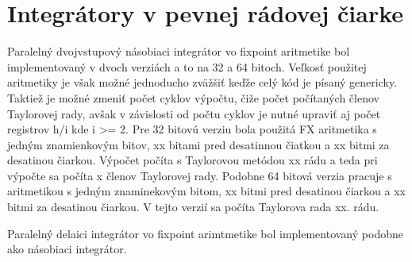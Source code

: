 \section{Integrátory v pevnej rádovej čiarke}
Paralelný dvojvstupový násobiaci integrátor vo fixpoint aritmetike bol implementovaný v dvoch verziách a to na 32 a 64 bitoch. Veľkosť použitej aritmetiky je však možné jednoducho zväžšiť keďže celý kód je písaný genericky. Taktiež je možné zmeniť počet cyklov výpočtu, čiže počet počítaných členov Taylorovej rady, avšak v závislosti od počtu cyklov je nutné upraviť aj počet registrov h/i kde i >= 2.
Pre 32 bitovú verziu bola použitá FX aritmetika s jedným znamienkovým bitov, xx bitami pred desatinnou čiatkou a xx bitmi za desatinou čiarkou. Výpočet počíta s Taylorovou metódou xx rádu a teda pri výpočte sa počíta x členov Taylorovej rady. 
Podobne 64 bitová verzia pracuje s aritmetikou s jedným znaminekovým bitom, xx bitmi pred desatinou čiarkou a xx bitmi za desatinou čiarkou. V tejto verzií sa počíta Taylorova rada xx. rádu. 

Paralelný delaici integrátor vo fixpoint arimtmetike bol implementovaný podobne ako násobiaci integrátor.



